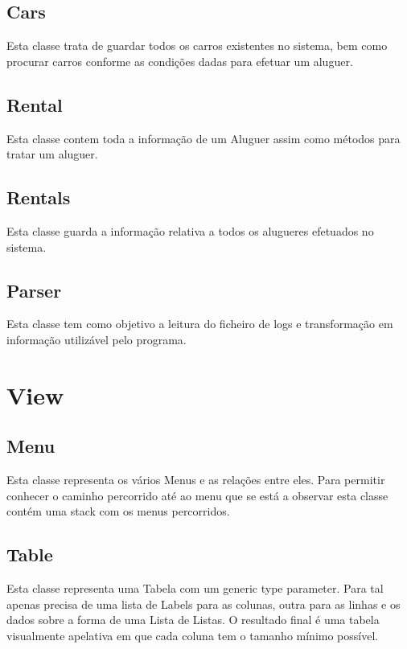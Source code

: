 \documentclass[a4paper]{report}
\begin{document}
\subsection{Cars}

Esta classe trata de guardar todos os carros existentes no sistema, bem
como procurar carros conforme as condições dadas para efetuar um aluguer.

\subsection{Rental}

Esta classe contem toda a informação de um Aluguer assim como métodos para tratar
um aluguer.

\subsection{Rentals}

Esta classe guarda a informação relativa a todos os alugueres efetuados
no sistema.

\subsection{Parser}

Esta classe tem como objetivo a leitura do ficheiro de logs e transformação
em informação utilizável pelo programa.

\section{View}

\subsection{Menu}

Esta classe representa os vários Menus e as relações entre eles. Para permitir
conhecer o caminho percorrido até ao menu que se está a observar esta classe
contém uma stack com os menus percorridos.

\subsection{Table}

Esta classe representa uma Tabela com um generic type parameter. Para tal
apenas precisa de uma lista de Labels para as colunas, outra para as linhas e
os dados sobre a forma de uma Lista de Listas.
O resultado final é uma tabela visualmente apelativa em que cada coluna tem o
tamanho mínimo possível.
\end{document}
